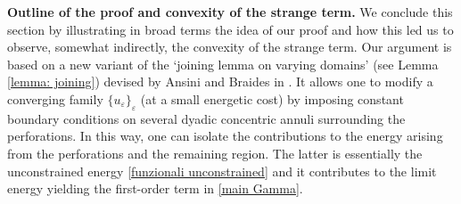 \documentclass{article}
\theoremstyle{plain}
\theoremstyle{definition}
\def\e{\varepsilon}
\numberwithin{equation}{section}
\begin{document}
{\bf Outline of the proof and convexity of the strange term.} We conclude this section by illustrating in broad terms the idea of our proof and how this led us to observe, somewhat indirectly, the convexity of the strange term. Our argument is based on a new variant of the `joining lemma on varying domains' (see Lemma \ref{lemma: joining}) devised by Ansini and Braides in \cite{AnsBraJMPA}. It allows one to modify a converging family $\{u_\e\}_\e$ (at a small energetic cost) by imposing constant boundary conditions on several dyadic concentric annuli surrounding the perforations. In this way, one can isolate the contributions to the energy arising from the perforations and the remaining region. The latter is essentially the unconstrained energy \eqref{funzionali unconstrained} and it contributes to the limit energy yielding the first-order term in \eqref{main Gamma}. 
\end{document}
